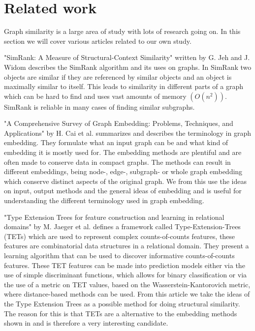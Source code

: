 \section{Related work}
\label{sec:Related_work}
Graph similarity is a large area of study with lots of research going on. In this section we will cover various articles related to our own study.


"SimRank: A Measure of Structural-Context Similarity" written by G. Jeh and J. Widom\cite{10.1145/775047.775126} describes the SimRank algorithm and its uses on graphs. In SimRank two objects are similar if they are referenced by similar objects and an object is maximally similar to itself. This leads to similarity in different parts of a graph which can be hard to find and uses vast amounts of memory $(O(n^2))$. SimRank is reliable in many cases of finding similar subgraphs.

"A Comprehensive Survey of Graph Embedding: Problems, Techniques, and Applications" by H. Cai et al.\cite{8294302} summarizes and describes the terminology in graph embedding. They formulate what an input graph can be and what kind of embedding it is mostly used for. The embedding methods are plentiful and are often made to conserve data in compact graphs. The methods can result in different embeddings, being node-, edge-, subgraph- or whole graph embedding which conserve distinct aspects of the original graph. We from this use the ideas on input, output methods and the general ideas of embedding and is useful for understanding the different terminology used in graph embedding.

"Type Extension Trees for feature construction and learning in relational domains" by M. Jaeger et al. \cite{JAEGER201330} defines a framework called Type-Extension-Trees (TETs) which are used to represent complex counts-of-counts features, these features are combinatorial data structures in a relational domain. They present a learning algorithm that can be used to discover informative counts-of-counts features. These TET features can be made into prediction models either via the use of simple discriminant functions, which allows for binary classification or via the use of a metric on TET values, based on the Wasserstein-Kantorovich metric, where distance-based methods can be used. From this article we take the ideas of the Type Extension Trees as a possible method for doing structural similarity. The reason for this is that TETs are a alternative to the embedding methods shown in \cite{8294302} and is therefore a very interesting candidate.

